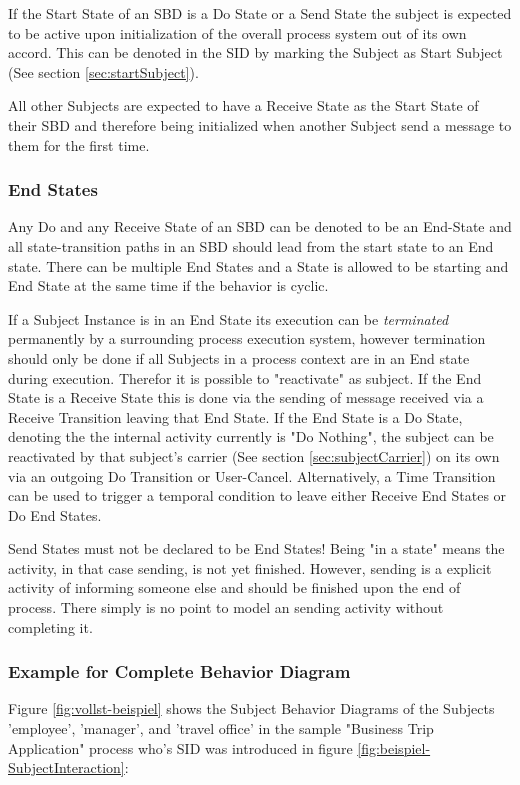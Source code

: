 If the Start State of an SBD is a Do State or a Send State the subject is expected to be active upon initialization of the overall process system out of its own accord. This can be denoted in the SID by marking the Subject as Start Subject (See section \ref{sec:startSubject}).

All other Subjects are expected to have a Receive State as the Start State of their SBD and therefore being initialized when another Subject send a message to them for the first time.

\subsubsection{End States}

Any Do and any Receive State of an SBD can be denoted to be an End-State and all state-transition paths in an SBD should lead from the start state to an End state. There can be multiple End States and a State is allowed to be starting and End State at the same time if the behavior is cyclic. 

If a Subject Instance is in an End State its execution can be \textit{terminated} permanently by a surrounding process execution system, however termination should only be done if all Subjects in a process context are in an End state during execution. Therefor it is possible to "reactivate" as subject. If the End State is a Receive State this is done via the sending of message received via a Receive Transition leaving that End State. If the End State is a Do State, denoting the the internal activity currently is "Do Nothing", the subject can be reactivated by that subject's carrier (See section \ref{sec:subjectCarrier}) on its own  via an outgoing Do Transition or User-Cancel. Alternatively, a Time Transition can be used to trigger a temporal condition to leave either Receive End States or Do End States.

Send States must not be declared to be End States! Being "in a state" means the activity, in that case sending, is not yet finished. However, sending is a explicit activity of informing someone else and should be finished upon the end of process. There simply is no point to model an sending activity without completing it. 

\subsubsection{Example for Complete Behavior Diagram}

Figure \ref{fig:vollst-beispiel} shows the Subject Behavior Diagrams of the Subjects 'employee', 'manager', and 'travel office' in the sample "Business Trip Application" process who's SID was introduced in  figure \ref{fig:beispiel-SubjectInteraction}:

